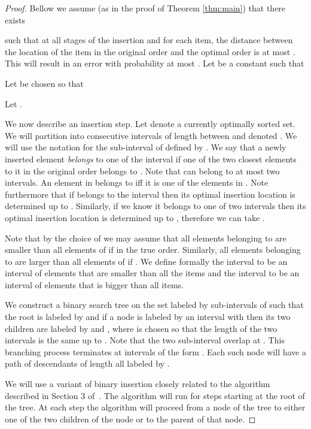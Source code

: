 \documentclass[11pt]{article}
\begin{document}
\begin{proof}
Bellow we assume (as in the proof of Theorem \ref{thm:main}) that there exists 
 
such that 
at all stages 
of the insertion and for each item, the distance between the location of the 
item in the original order and the optimal order is at most . 
This will result in an error with probability at most . 
Let  be a constant such that 


Let  be chosen so that 

Let .  

We now describe an insertion step. 
Let  denote a currently optimally sorted set. We will partition  into 
consecutive intervals of length between  and  denoted
. We will use the notation  
for the sub-interval of  defined by 
. 
We say that a newly inserted element  {\em belongs} 
to one of the interval  
if one of the two closest elements to it in the original order belongs to 
. Note that  can belong to at most two intervals. An element in  belongs to  iff it is one of the elements in .
Note furthermore 
that if  belongs to the interval  then its optimal insertion location 
is determined up to . Similarly, if we know 
it belongs to one of two intervals then its optimal insertion location 
is determined up to , therefore we can take
.

Note that by the choice of  
we may assume that all elements belonging to  are 
smaller than all elements of  if  in the true order. 
Similarly, all elements belonging to  are larger than all elements of 
 if .  
We define formally the interval  to be an interval of elements that are smaller than all the items and the interval  
to be an interval of elements that is bigger than all items. 



We construct a binary search tree on the set  labeled by 
sub-intervals of  such that the root is labeled by  and 
if a node is labeled by an interval  with 
 then its two children 
are labeled by  and , where  is chosen so that the 
length of the two intervals is the same up to . Note that the two 
sub-interval overlap at . This branching process terminates at intervals 
of the form . Each such node will have a path of descendants of length 
 all labeled by . 

We will use a variant of binary insertion closely related to 
the algorithm described in Section 3 of~\cite{FPRU:90}. The algorithm 
will run for  steps starting at the root of the tree. 
At each step the algorithm will proceed from a node of the tree to either 
one of the two children of the node or to the parent of that node. 


\end{proof}
\end{document}
